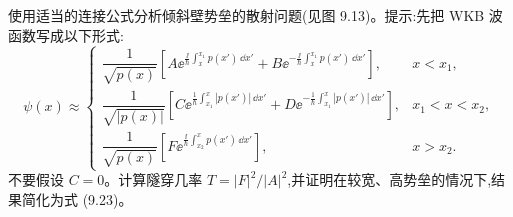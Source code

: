 \begin{question}
使用适当的连接公式分析倾斜壁势垒的散射问题(见图 9.13)。提示:先把 WKB 波函数写成以下形式:
\[
\psi(x)\approx
\begin{cases}
\dfrac{1}{\sqrt{p(x)}}\left[A\ee^{\frac{\ii}{\hbar}\int_x^{x_1}p(x')\,\dd x'}+B\ee^{-\frac{\ii}{\hbar}\int_x^{x_1}p(x')\,\dd x'}\right], & x<x_1,\\[1.1em]
\dfrac{1}{\sqrt{|p(x)|}}\left[C\ee^{\frac{1}{\hbar}\int_{x_1}^x|p(x')|\,\dd x'}+D\ee^{-\frac{1}{\hbar}\int_{x_1}^x|p(x')|\,\dd x'}\right], & x_1<x<x_2,\\[1.1em]
\dfrac{1}{\sqrt{p(x)}}\left[F\ee^{\frac{\ii}{\hbar}\int_{x_2}^x p(x')\,\dd x'}\right], & x>x_2.
\end{cases}
\]
不要假设 $C=0$。计算隧穿几率 $T=|F|^2/|A|^2$,并证明在较宽、高势垒的情况下,结果简化为式 (9.23)。

\par\smallskip
{}

\end{question}
